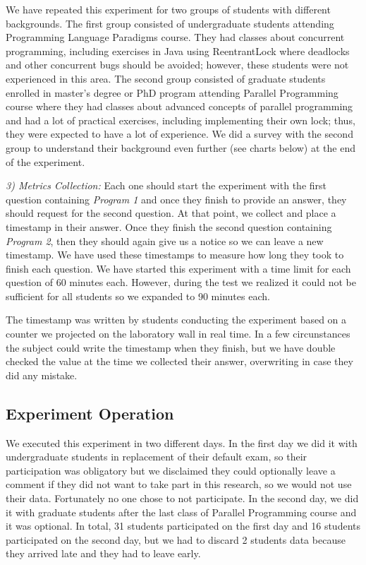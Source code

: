 
We have repeated this experiment for two groups of students with different backgrounds. The first group consisted of undergraduate students attending Programming Language Paradigms course. They had classes about concurrent programming, including exercises in Java using ReentrantLock where deadlocks and other concurrent bugs should be avoided; however, these students were not experienced in this area. The second group consisted of graduate students enrolled in master's degree or PhD program attending Parallel Programming course where they had classes about advanced concepts of parallel programming and had a lot of practical exercises, including implementing their own lock; thus, they were expected to have a lot of experience. We did a survey with the second group to understand their background even further (see charts below) at the end of the experiment.


\emph{3) Metrics Collection:} Each one should start the experiment with the first question containing \emph{Program 1} and once they finish to provide an answer, they should request for the second question. At that point, we collect and place a timestamp in their answer. Once they finish the second question containing \emph{Program 2}, then they should again give us a notice so we can leave a new timestamp. We have used these timestamps to measure how long they took to finish each question. We have started this experiment with a time limit for each question of 60 minutes each. However, during the test we realized it could not be sufficient for all students so we expanded to 90 minutes each.

The timestamp was written by students conducting the experiment based on a counter we projected on the laboratory wall in real time. In a few circunstances the subject could write the timestamp when they finish, but we have double checked the value at the time we collected their answer, overwriting in case they did any mistake.

\subsection{Experiment Operation}

We executed this experiment in two different days. In the first day we did it with undergraduate students in replacement of their default exam, so their participation was obligatory but we disclaimed they could optionally leave a comment if they did not want to take part in this research, so we would not use their data. Fortunately no one chose to not participate. In the second day, we did it with graduate students after the last class of Parallel Programming course and it was optional. In total, 31 students participated on the first day and 16 students participated on the second day, but we had to discard 2 students data because they arrived late and they had to leave early.

